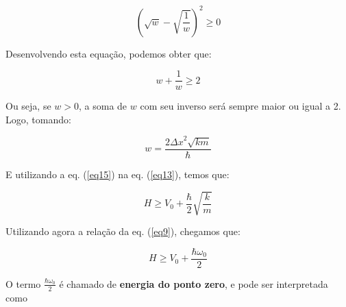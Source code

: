\begin{equation}
    \left(\sqrt{w} - \sqrt{\frac{1}{w}} \right)^2 \geq 0   \label{eq14}
\end{equation}

Desenvolvendo esta equação, podemos obter que:

\begin{equation}
    w + \frac{1}{w} \geq 2   \label{eq15}
\end{equation}

Ou seja, se $w > 0$, a soma de $w$ com seu inverso será sempre maior ou igual a 2. Logo, tomando:

\begin{equation}
    w = \frac{2{\Delta x}^2 \sqrt{km}}{\hbar}   \label{eq16}
\end{equation}

E utilizando a eq. (\ref{eq15}) na eq. (\ref{eq13}), temos que:

\begin{equation}
    H \geq V_0 + \frac{\hbar}{2}\sqrt{\frac{k}{m}}   \label{eq17}
\end{equation}

Utilizando agora a relação da eq. (\ref{eq9}), chegamos que:

\begin{equation}
    H \geq V_0 + \frac{\hbar {\omega}_0}{2}   \label{eq18}
\end{equation}

O termo $\frac{\hbar {\omega}_0}{2}$ é chamado de \textbf{energia do ponto zero}, e pode ser interpretada como 

